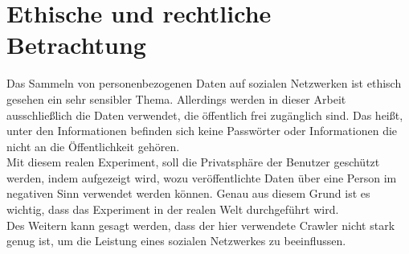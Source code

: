 \chapter{Ethische und rechtliche Betrachtung}  %
\label{cha:EthischeUndRechtlicheBetrachtung} %
Das Sammeln von personenbezogenen Daten auf sozialen Netzwerken ist ethisch gesehen ein sehr sensibler Thema. Allerdings werden in dieser Arbeit ausschließlich die Daten verwendet, die öffentlich frei zugänglich sind. Das heißt, unter den Informationen befinden sich keine Passwörter oder Informationen die nicht an die Öffentlichkeit gehören.\\
Mit diesem realen Experiment, soll die Privatsphäre der Benutzer geschützt werden, indem aufgezeigt wird, wozu veröffentlichte Daten über eine Person im negativen Sinn verwendet werden können. Genau aus diesem Grund ist es wichtig, dass das Experiment in der realen Welt durchgeführt wird.\\
Des Weitern kann gesagt werden, dass der hier verwendete Crawler nicht stark genug ist, um die Leistung eines sozialen Netzwerkes zu beeinflussen.
